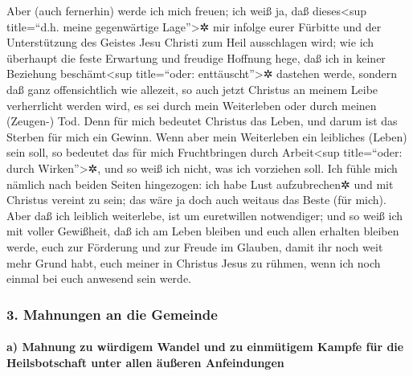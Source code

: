 Aber (auch fernerhin) werde ich mich freuen;  ich weiß
ja, daß dieses\textless sup title=``d.h. meine gegenwärtige
Lage''\textgreater✲ mir infolge eurer Fürbitte und der Unterstützung des
Geistes Jesu Christi zum Heil ausschlagen wird;  wie ich
überhaupt die feste Erwartung und freudige Hoffnung hege, daß ich in
keiner Beziehung beschämt\textless sup title=``oder:
enttäuscht''\textgreater✲ dastehen werde, sondern daß ganz
offensichtlich wie allezeit, so auch jetzt Christus an meinem Leibe
verherrlicht werden wird, es sei durch mein Weiterleben oder durch
meinen (Zeugen-) Tod.  Denn für mich bedeutet Christus
das Leben, und darum ist das Sterben für mich ein Gewinn.
 Wenn aber mein Weiterleben ein leibliches (Leben) sein
soll, so bedeutet das für mich Fruchtbringen durch Arbeit\textless sup
title=``oder: durch Wirken''\textgreater✲, und so weiß ich nicht, was
ich vorziehen soll.  Ich fühle mich nämlich nach beiden
Seiten hingezogen: ich habe Lust aufzubrechen✲ und mit Christus vereint
zu sein; das wäre ja doch auch weitaus das Beste (für mich).
 Aber daß ich leiblich weiterlebe, ist um euretwillen
notwendiger;  und so weiß ich mit voller Gewißheit, daß
ich am Leben bleiben und euch allen erhalten bleiben werde, euch zur
Förderung und zur Freude im Glauben,  damit ihr noch weit
mehr Grund habt, euch meiner in Christus Jesus zu rühmen, wenn ich noch
einmal bei euch anwesend sein werde.

\hypertarget{mahnungen-an-die-gemeinde}{%
\subsubsection{3. Mahnungen an die
Gemeinde}\label{mahnungen-an-die-gemeinde}}

\hypertarget{a-mahnung-zu-wuxfcrdigem-wandel-und-zu-einmuxfctigem-kampfe-fuxfcr-die-heilsbotschaft-unter-allen-uxe4uuxdferen-anfeindungen}{%
\paragraph{a) Mahnung zu würdigem Wandel und zu einmütigem Kampfe für
die Heilsbotschaft unter allen äußeren
Anfeindungen}\label{a-mahnung-zu-wuxfcrdigem-wandel-und-zu-einmuxfctigem-kampfe-fuxfcr-die-heilsbotschaft-unter-allen-uxe4uuxdferen-anfeindungen}}

